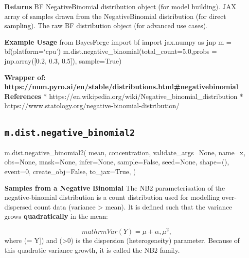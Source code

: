 \documentclass[
  letterpaper,
  DIV=11,
  numbers=noendperiod]{scrartcl}
\newenvironment{Shaded}{\begin{snugshade}}{\end{snugshade}}
\newcommand{\DecValTok}[1]{\textcolor[rgb]{0.68,0.00,0.00}{#1}}
\newcommand{\NormalTok}[1]{\textcolor[rgb]{0.00,0.23,0.31}{#1}}
\newcommand{\OperatorTok}[1]{\textcolor[rgb]{0.37,0.37,0.37}{#1}}
\newcommand{\StringTok}[1]{\textcolor[rgb]{0.13,0.47,0.30}{#1}}
\newcommand{\VariableTok}[1]{\textcolor[rgb]{0.07,0.07,0.07}{#1}}
\begin{document}
\textbf{Returns} BF NegativeBinomial distribution object (for model
building). JAX array of samples drawn from the NegativeBinomial
distribution (for direct sampling). The raw BF distribution object (for
advanced use cases).

\textbf{Example Usage} from BayesForge import bf import jax.numpy as jnp
m = bf(platform=`cpu') m.dist.negative\_binomial(total\_count=5.0,probs
= jnp.array({[}0.2, 0.3, 0.5{]}), sample=True)

\textbf{Wrapper of:
https://num.pyro.ai/en/stable/distributions.html\#negativebinomial}
\textbf{References} *
https://en.wikipedia.org/wiki/Negative\_binomial\_distribution *
https://www.statology.org/negative-binomial-distribution/

\subsection{\texorpdfstring{\texttt{m.dist.negative\_binomial2}}{m.dist.negative\_binomial2}}\label{negative_binomial2}

\begin{Shaded}
\begin{Highlighting}[]
\NormalTok{m.dist.negative\_binomial2(}
\NormalTok{    mean,}
\NormalTok{    concentration,}
\NormalTok{    validate\_args}\OperatorTok{=}\VariableTok{None}\NormalTok{,}
\NormalTok{    name}\OperatorTok{=}\StringTok{\textquotesingle{}x\textquotesingle{}}\NormalTok{,}
\NormalTok{    obs}\OperatorTok{=}\VariableTok{None}\NormalTok{,}
\NormalTok{    mask}\OperatorTok{=}\VariableTok{None}\NormalTok{,}
\NormalTok{    infer}\OperatorTok{=}\VariableTok{None}\NormalTok{,}
\NormalTok{    sample}\OperatorTok{=}\VariableTok{False}\NormalTok{,}
\NormalTok{    seed}\OperatorTok{=}\VariableTok{None}\NormalTok{,}
\NormalTok{    shape}\OperatorTok{=}\NormalTok{(),}
\NormalTok{    event}\OperatorTok{=}\DecValTok{0}\NormalTok{,}
\NormalTok{    create\_obj}\OperatorTok{=}\VariableTok{False}\NormalTok{,}
\NormalTok{    to\_jax}\OperatorTok{=}\VariableTok{True}\NormalTok{,}
\NormalTok{)}
\end{Highlighting}
\end{Shaded}

\textbf{Samples from a Negative Binomial} The NB2 parameterisation of
the negative-binomial distribution is a count distribution used for
modelling over-dispersed count data (variance \textgreater{} mean). It
is defined such that the variance grows \textbf{quadratically} in the
mean:

\[
mathrm{Var}(Y) = \mu + \alpha,\mu^2,
\] where (\mu = \mathbb{E}{[}Y{]}) and (\alpha\textgreater0) is the
dispersion (heterogeneity) parameter. Because of this quadratic variance
growth, it is called the NB2 family.
\end{document}
